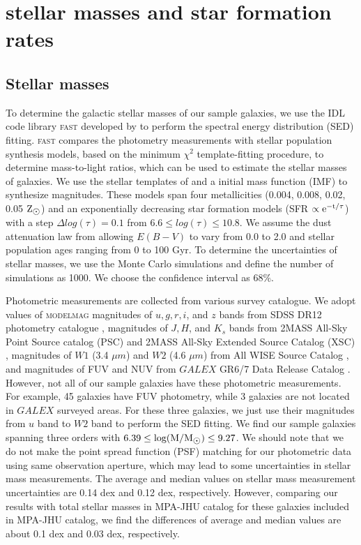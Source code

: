 \documentclass[usenatbib]{raa}
\begin{document}
\section{stellar masses and star formation rates}
\label{stellar}

\subsection{Stellar masses}
\label{stellar masses}
To determine the galactic stellar masses of our sample galaxies, we use the IDL 
code library 
\textsc{fast} developed by \cite{2009ApJ...700..221K} to perform the spectral 
energy distribution
(SED) fitting. \textsc{fast} compares the photometry measurements with stellar 
population 
synthesis models, based on the minimum $\chi ^2$ template-fitting procedure, to 
determine 
mass-to-light ratios, which can be used to estimate the stellar masses of 
galaxies.  
We use the stellar templates of \cite{2003MNRAS.344.1000B} and a
\cite{2003PASP..115..763C} initial 
mass function (IMF) to synthesize magnitudes. These models span four 
metallicities (0.004, 0.008, 0.02, 0.05 $\hbox{${\rm Z}_{\hbox{$\odot$}}$}$) and an exponentially decreasing 
star
formation models (SFR $\propto \rm e^{-t/\tau}$) with a step $\Delta log(\tau) = 
0.1$ 
from $6.6 \leq log(\tau) \leq 10.8$. We assume the dust attenuation law from
\cite{2000ApJ...533..682C} allowing $E(B-V)$ to vary from 0.0 to 2.0 and stellar 
population
ages ranging from 0 to 100 Gyr. To determine the uncertainties of stellar 
masses, we use the Monte Carlo simulations and define the number of simulations 
as 1000. We choose the confidence interval as 68$\%$. 

Photometric measurements are collected from various survey catalogue. We adopt 
values 
of \textsc{modelmag} magnitudes of $u, g, r, i$, and $z$ bands from SDSS DR12 
photometry catalogue
\citep{2004AJ....128..502A, 2015ApJS..219...12A}, 
magnitudes of $J, H$, and $K_s$ bands from 2MASS All-Sky Point Source catalog 
(PSC)
and 2MASS All-Sky
Extended Source Catalog (XSC) \citep{2006AJ....131.1163S}, magnitudes of $W1$ 
(3.4 $\mu m$) and $W2$ (4.6
$\mu m$) from All WISE Source Catalog \citep{2010AJ....140.1868W}, and 
magnitudes of FUV 
and NUV from $GALEX$ GR6/7 Data Release Catalog \citep{2014AdSpR..53..900B}.
However, not all of our sample galaxies have these photometric measurements. For 
example,
 45 
galaxies have FUV photometry, while 3 galaxies are not
    located in $GALEX$ surveyed areas. For these three galaxies, we 
just use their  magnitudes from $u$ band to $W2$ band to 
perform the SED fitting. 
We find our sample galaxies spanning three orders with 
$\rm 6.39 \leq log(M/M_{\hbox{$\odot$}}) \leq 9.27$. We should note that we do not 
make the point spread function (PSF) matching for our photometric data using 
same observation aperture, which may lead to some uncertainties in stellar 
mass measurements. The average and median values on stellar mass 
measurement uncertainties are 0.14 dex and 0.12 dex, respectively. However, 
comparing our results with total stellar masses in 
MPA-JHU 
catalog \citep{2003MNRAS.341...33K, 2004MNRAS.351.1151B} for these galaxies 
included in MPA-JHU catalog, we find the differences of average and median 
values are about 0.1 dex and 0.03 dex, respectively. 
\end{document}
